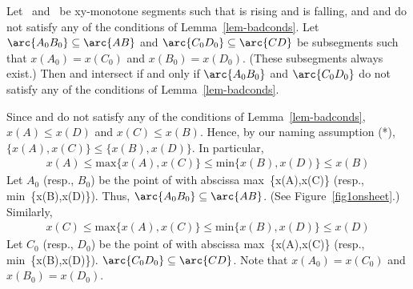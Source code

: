 \begin{lemma}
Let \ and \ be xy-monotone segments such that  is 
rising and  is falling,
and  and   do not satisfy any of the
conditions of Lemma~\ref{lem-badconds}.
Let $\arc{A_{0}B_{0}} \subseteq \arc{AB}$ and
$\arc{C_{0}D_{0}} \subseteq \arc{CD}$  be subsegments such that 
  $x(A_{0}) = x(C_{0})$ and 
  $x(B_{0}) = x(D_{0})$.
(These subsegments always exist.)
Then  and  intersect if and only if
$\arc{A_{0}B_{0}}$ and $\arc{C_{0}D_{0}}$ do not satisfy any of the conditions
of Lemma~\ref{lem-badconds}.
\end{lemma}
Since  and  do not satisfy any of the conditions of 
Lemma~\ref{lem-badconds}, $x(A) \leq x(D)$ and $x(C) \leq x(B)$.
Hence, by our naming assumption (*), $\{x(A),x(C)\} \leq \{x(B),x(D)\}$.
In particular, 
\begin{eqnarray*}
x(A) \leq \mbox{max} \{x(A),x(C)\} \leq \mbox{min} \{x(B),x(D)\} \leq x(B)
\end{eqnarray*}
Let $A_{0}$ (resp., $B_{0}$) be the point of  with abscissa
\mbox{max \{x(A),x(C)\}} (resp., \mbox{min \{x(B),x(D)\}}).
Thus, $\arc{A_{0}B_{0}} \subseteq \arc{AB}$.
(See Figure~\ref{fig1onsheet}.)
Similarly,
\begin{eqnarray*}
x(C) \leq \mbox{max} \{x(A),x(C)\} \leq \mbox{min} \{x(B),x(D)\} \leq x(D)
\end{eqnarray*}
Let $C_{0}$ (resp., $D_{0}$) be the point of  with abscissa
\mbox{max \{x(A),x(C)\}} (resp., \mbox{min \{x(B),x(D)\}}).
$\arc{C_{0}D_{0}} \subseteq \arc{CD}$.
Note that $x(A_{0}) = x(C_{0})$ and $x(B_{0}) = x(D_{0})$.

